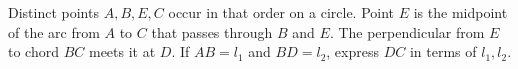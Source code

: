 Distinct points $A,B,E,C$ occur in that order on a circle. Point $E$ is the midpoint of the arc from $A$ to $C$ that passes through $B$ and $E$. The perpendicular from $E$ to chord $BC$ meets it at $D$. If $AB=l_1$ and $BD=l_2$, express $DC$ in terms of $l_1,l_2$.
